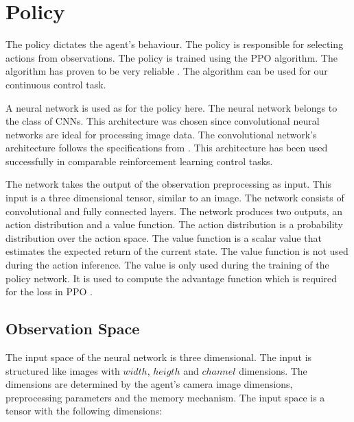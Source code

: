 
\section{Policy}
\label{fig:policy_description}

The policy dictates the agent's behaviour. The policy is responsible for selecting actions from observations. The policy is trained using the \ac{PPO} algorithm. The algorithm has proven to be very reliable \textcite{ppo}. The algorithm can be used for our continuous control task.

A neural network is used as for the policy here. The neural network belongs to the class of \acp{CNN}. This architecture was chosen since convolutional neural networks are ideal for processing image data. The convolutional network's architecture follows the specifications from \textcite{human_level_control}. This architecture has been used successfully in comparable reinforcement learning control tasks.

The network takes the output of the observation preprocessing as input. This input is a three dimensional tensor, similar to an image. The network consists of convolutional and fully connected layers. The network produces two outputs, an action distribution and a value function. The action distribution is a probability distribution over the action space.
The value function is a scalar value that estimates the expected return of the current state. The value function is not used during the action inference. The value is only used during the training of the policy network. It is used to compute the advantage function which is required for the loss in \ac{PPO} \textcite{ppo}.






\subsection{Observation Space}

The input space of the neural network is three dimensional. The input is structured like images with $width$, $heigth$ and $channel$ dimensions. The dimensions are determined by the agent's camera image dimensions, preprocessing parameters and the memory mechanism. The input space is a tensor with the following dimensions:

